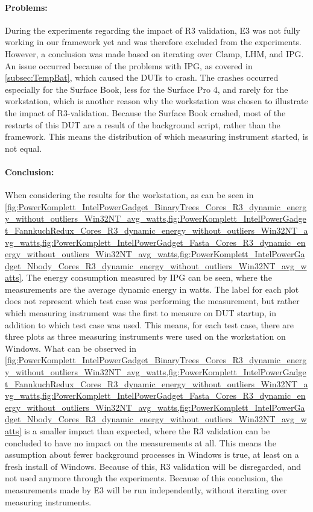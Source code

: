\paragraph{Problems:} During the experiments regarding the impact of R3 validation, E3 was not fully working in our framework yet and was therefore excluded from the experiments. However, a conclusion was made based on iterating over Clamp, LHM, and IPG. An issue occurred because of the problems with IPG, as covered in \cref{subsec:TempBat}, which caused the DUTs to crash. The crashes occurred especially for the Surface Book, less for the Surface Pro 4, and rarely for the workstation, which is another reason why the workstation was chosen to illustrate the impact of R3-validation. Because the Surface Book crashed, most of the restarts of this DUT are a result of the background script, rather than the framework. This means the distribution of which measuring instrument started, is not equal.

\paragraph{Conclusion:} When considering the results for the workstation, as can be seen in \cref{fig:PowerKomplett_IntelPowerGadget_BinaryTrees_Cores_R3_dynamic_energy_without_outliers_Win32NT_avg_watts,fig:PowerKomplett_IntelPowerGadget_FannkuchRedux_Cores_R3_dynamic_energy_without_outliers_Win32NT_avg_watts,fig:PowerKomplett_IntelPowerGadget_Fasta_Cores_R3_dynamic_energy_without_outliers_Win32NT_avg_watts,fig:PowerKomplett_IntelPowerGadget_Nbody_Cores_R3_dynamic_energy_without_outliers_Win32NT_avg_watts}. The energy consumption measured by IPG can be seen, where the measurements are the average dynamic energy in watts. The label for each plot does not represent which test case was performing the measurement, but rather which measuring instrument was the first to measure on DUT startup, in addition to which test case was used. This means, for each test case, there are three plots as three measuring instruments were used on the workstation on Windows. What can be observed in \cref{fig:PowerKomplett_IntelPowerGadget_BinaryTrees_Cores_R3_dynamic_energy_without_outliers_Win32NT_avg_watts,fig:PowerKomplett_IntelPowerGadget_FannkuchRedux_Cores_R3_dynamic_energy_without_outliers_Win32NT_avg_watts,fig:PowerKomplett_IntelPowerGadget_Fasta_Cores_R3_dynamic_energy_without_outliers_Win32NT_avg_watts,fig:PowerKomplett_IntelPowerGadget_Nbody_Cores_R3_dynamic_energy_without_outliers_Win32NT_avg_watts} is a smaller impact than expected, where the R3 validation can be concluded to have no impact on the measurements at all. This means the assumption about fewer background processes in Windows is true, at least on a fresh install of Windows. Because of this, R3 validation will be disregarded, and not used anymore through the experiments. Because of this conclusion, the measurements made by E3 will be run independently, without iterating over measuring instruments.
